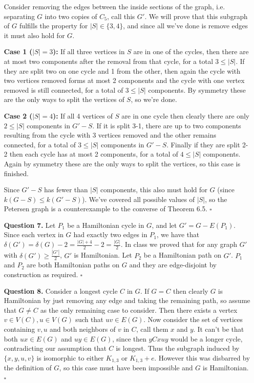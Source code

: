 \documentclass[letterpaper, reqno,11pt]{article}
\begin{document}
Consider removing the edges between the inside sections of the graph, i.e. separating $G$ into two copies of $C_5$, call this $G'$. We will prove that this subgraph of $G$ fulfills the property for $|S|\in \{3,4\} $, and since all we've done is remove edges it must also hold for $G$.

{\noindent\bf Case 1 ($|S|=3$):} If all three vertices in $S$ are in one of the cycles, then there are at most two components after the removal from that cycle, for a total $3\leq |S|$. If they are split two on one cycle and 1 from the other, then again the cycle with two vertices removed forms at most 2 components and the cycle with one vertex removed is still connected, for a total of $3\leq |S|$ components. By symmetry these are the only ways to split the vertices of $S$, so we're done. 

{\noindent\bf Case 2 ($|S|=4$):} If all 4 vertices of $S$ are in one cycle then clearly there are only $2\leq |S|$ components in $G'-S$. If it is split 3-1, there are up to two components resulting from the cycle with $3$ vertices removed and the other remains connected, for a total of $3\leq |S|$ components in $G'-S$. Finally if they are split 2-2 then each cycle has at most 2 components, for a total of $4\leq |S|$ components. Again by symmetry these are the only ways to split the vertices, so this case is finished. 

Since $G'-S$ has fewer than $|S|$ components, this also must hold for $G$ (since $k(G-S)\leq k(G'-S)$). We've covered all possible values of $|S|$, so the Petersen graph is a counterexample to the converse of Theorem 6.5. $\square$

{\medskip\noindent\bf Question 7.} Let $P_1$ be a Hamiltonian cycle in $G$, and let $G'=G-E(P_1)$. Since each vertex in $G$ had exactly two edges in $P_1$, we have that $\delta(G')=\delta(G)-2=\frac{|G|+4}{2}-2=\frac{|G|}{2}$. In class we proved that for any graph $G'$ with $\delta(G')\geq \frac{|G'|}{2}$, $G'$ is Hamiltonian. Let $P_2$ be a Hamiltonian path on $G'$. $P_1$ and $P_2$ are both Hamiltonian paths on $G$ and they are edge-disjoint by construction as required. $\square$

{\medskip\noindent\bf Question 8.} Consider a longest cycle $C$ in $G$. If $G=C$ then clearly $G$ is Hamiltonian by just removing any edge and taking the remaining path, so assume that $G\neq C$ as the only remaining case to consider. Then there exists a vertex $v\in V(C), u\in V(G)$ such that $uv\in E(G)$. Now consider the set of vertices containing $v, u$ and both neighbors of $v$ in $C$, call them $x$ and $y$. It can't be that both $ux\in E(G)$ and $uy\in E(G)$, since then $yCxuy$ would be a longer cycle, contradicting our assumption that $C$ is longest. Thus the subgraph induced by $\{x, y, u, v\} $ is isomorphic to either $K_{1,3}$ or $K_{1,3}+e$. However this was disbarred by the definition of $G$, so this case must have been impossible and $G$ is Hamiltonian. $\square$
\end{document}
